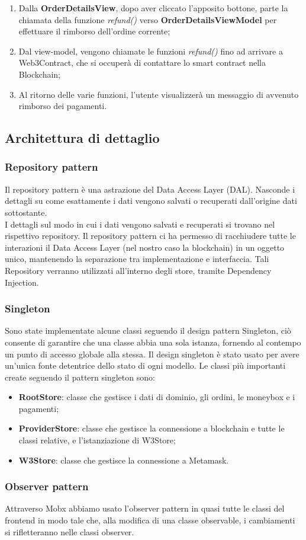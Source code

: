 \begin{enumerate}
    \item Dalla \textbf{OrderDetailsView}, dopo aver cliccato l'apposito bottone, parte la chiamata della funzione \textit{refund()} verso \textbf{OrderDetailsViewModel} per effettuare il rimborso dell'ordine corrente;
    \item Dal view-model, vengono chiamate le funzioni \textit{refund()} fino ad arrivare a Web3Contract, che si occuperà di contattare lo smart contract nella Blockchain;
    \item Al ritorno delle varie funzioni, l'utente visualizzerà un messaggio di avvenuto rimborso dei pagamenti.
\end{enumerate}

\clearpage
\subsection{Architettura di dettaglio}

\subsubsection{Repository pattern}

Il repository pattern è una astrazione del Data Access Layer (DAL\glo). Nasconde i dettagli su come esattamente i dati vengono salvati o recuperati dall'origine dati sottostante.\\
I dettagli sul modo in cui i dati vengono salvati e recuperati si trovano nel rispettivo repository.
Il repository pattern ci ha permesso di racchiudere tutte le interazioni il Data Access Layer (nel nostro caso la blockchain) in un oggetto unico, mantenendo la separazione tra implementazione e interfaccia. Tali Repository verranno utilizzati all'interno degli store, tramite Dependency Injection\glo{}.

\subsubsection{Singleton}

Sono state implementate alcune classi seguendo il design pattern Singleton,
 ciò consente di garantire che una classe abbia una sola istanza, fornendo al contempo un punto di accesso globale alla stessa.
Il design singleton è stato usato per avere un'unica fonte detentrice dello stato di ogni modello.
Le classi più importanti create seguendo il pattern singleton sono:

\begin{itemize}
    \item \textbf{RootStore}: classe che gestisce i dati di dominio, gli ordini, le moneybox e i pagamenti;
    \item \textbf{ProviderStore}: classe che gestisce la connessione a blockchain e tutte le classi relative, e l'istanziazione di W3Store;
    \item \textbf{W3Store}: classe che gestisce la connessione a Metamask.
\end{itemize}

\subsubsection{Observer pattern}

Attraverso Mobx abbiamo usato l'observer pattern in quasi tutte le classi del frontend in modo tale che, alla modifica di una classe observable, i cambiamenti si rifletteranno nelle classi observer.